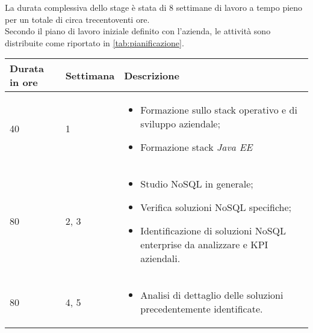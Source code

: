 La durata complessiva dello stage è stata di 8 settimane di lavoro a tempo pieno per un totale di circa trecentoventi ore.\\
\noindent Secondo il piano di lavoro iniziale definito con l'azienda, le attività sono distribuite come riportato in \autoref{tab:pianificazione}.\\

\begin{table}
\begin{center}

        \renewcommand{\arraystretch}{1.5}
    
        \centering
        \begin{longtable}{| C{2.5cm} | C{2cm} | L{7.2cm} | }
            
            \hline
            
            \textbf{Durata in ore} & \textbf{Settimana} & \textbf{Descrizione} \\
            
            \hline
            
            40 & 1 &
            \begin{itemize}[leftmargin=*]
                \item Formazione sullo stack operativo e di sviluppo aziendale;
                \item Formazione stack \textit{Java EE}
            \end{itemize} \\
            
            \hline
            
            80 & 2, 3 &
            \begin{itemize}[leftmargin=*]
                \item Studio NoSQL in generale;
                \item Verifica soluzioni NoSQL specifiche;
                \item Identificazione di soluzioni NoSQL enterprise da analizzare e \gls{KPI} aziendali. 
            \end{itemize}  \\
            
            \hline
        
            
            80 & 4, 5 &
            \begin{itemize}[leftmargin=*]
                \item Analisi di dettaglio delle soluzioni precedentemente identificate. 
            \end{itemize}  \\
             

\end{longtable}
\end{center}
\end{table}
